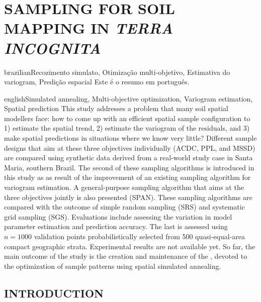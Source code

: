 \artigotrue
\chapter{SAMPLING FOR SOIL MAPPING IN \emph{TERRA INCOGNITA}}
\label{chap:chap08}

\def\ptkeys{Recozimento simulato, Otimização multi-objetivo, Estimativa do variogram, Predição espacial}

\begin{chapterabstract}{brazilian}{\ptkeys}
Este é o resumo em português.
\end{chapterabstract}

\def\enkeys{Simulated annealing, Multi-objective optimization, Variogram estimation, Spatial prediction}
  
\begin{chapterabstract}{english}{\enkeys}
This study addresses a problem that many soil spatial modellers face: how to come up with an efficient spatial 
sample configuration to 1) estimate the spatial trend, 2) estimate the variogram of the residuals, and 3) make 
spatial predictions in situations where we know very little? Different sample designs that aim at these three
objectives individually (ACDC, PPL, and MSSD) are compared using synthetic data derived from a real-world 
study case in Santa Maria, southern Brazil. The second of these sampling algorithms is introduced in this 
study as as result of the improvement of an existing sampling algorithm for variogram estimation. A 
general-purpose sampling algorithm that aims at the three objectives jointly is also presented (SPAN). These 
sampling algorithms are compared with the outcome of simple random sampling (SRS) and systematic grid sampling 
(SGS). Evaluations include assessing the variation in model parameter estimation and prediction accuracy. The 
last is assessed using $n = 1000$ validation points probabilistically selected from 500 quasi-equal-area 
compact geographic strata. Experimental results are not available yet. So far, the main outcome of the study 
is the creation and maintenance of the , devoted to the optimization of sample patterns using 
spatial simulated annealing.
\end{chapterabstract}

\formatchapter

\section{INTRODUCTION}

